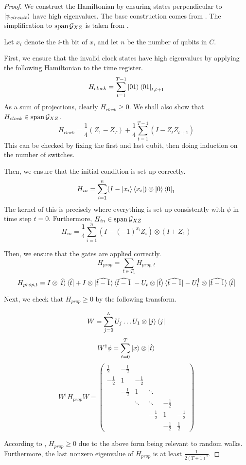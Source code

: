 \begin{proof}
	We construct the Hamiltonian by ensuring states perpendicular to $\ket{\psi_{circuit}}$ have high eigenvalues. The base construction comes from \cite{kitaev2002classical}. The simplification to $\operatorname*{\operatorname{span}}\mathcal{G}_{XZ}$ is taken from \cite{PhysRevA.78.012352}.

	Let $x_i$ denote the $i$-th bit of $x$, and let $n$ be the number of qubits in $C$.

	First, we ensure that the invalid clock states have high eigenvalues by applying the following Hamiltonian to the time register.
	$$H_{clock}=\sum_{t=1}^{T-1}\ket{01}\bra{01}_{t,t+1}$$
	As a sum of projections, clearly $H_{clock}\geq 0$. We shall also show that $H_{clock}\in\operatorname*{\operatorname{span}}\mathcal{G}_{XZ}$.
	$$H_{clock}=\frac{1}{4}(Z_1 - Z_T) + \frac{1}{4}\sum_{t=1}^{T-1}(I-Z_tZ_{t+1}) $$
	This can be checked by fixing the first and last qubit, then doing induction on the number of switches.

	Then, we ensure that the initial condition is set up correctly.
	$$H_{in}=\sum_{i=1}^n(I-\ket{x_i}\bra{x_i})\otimes\ket{0}\bra{0}_1$$
	The kernel of this is precisely where everything is set up consistently with $\phi$ in time step $t=0$. Furthermore, $H_{in}\in\operatorname*{\operatorname{span}}\mathcal{G}_{XZ}$
	$$H_{in}=\frac{1}{4}\sum_{i=1}^n(I-(-1)^{x_i}Z_i)\otimes(I+Z_1)$$

	Then, we ensure that the gates are applied correctly.
	$$H_{prop}=\sum_{t\in T_1}H_{prop,t}$$
	$$H_{prop,t}=I\otimes\ket{\widehat{t}}\bra{\widehat{t}}
	+I\otimes\ket{\widehat{t-1}}\bra{\widehat{t-1}}
	-U_t\otimes\ket{\widehat{t}}\bra{\widehat{t-1}}
	-U_t^\dagger\otimes\ket{\widehat{t-1}}\bra{\widehat{t}}$$

	Next, we check that $H_{prop}\geq0$ by the following transform.

	$$W=\sum_{j=0}^L U_j\ldots U_1\otimes\ket{j}\bra{j}$$
	$$W^\dagger\phi=\sum_{t=0}^T\ket{x}\otimes\ket{\hat{t}}$$
	$$W^\dagger H_{prop} W=
	\begin{pmatrix}
		\frac{1}{2} & -\frac{1}{2} & & & &  \\
		-\frac{1}{2} & 1 & -\frac{1}{2} & & & \\
		& -\frac{1}{2} & 1 & \ddots & & \\
		& & \ddots & \ddots & -\frac{1}{2} & \\
		& & & -\frac{1}{2} & 1 & -\frac{1}{2} \\
		& & & & -\frac{1}{2} & \frac{1}{2}
	\end{pmatrix}$$

	According to \cite{2002quant.ph.10077A}, $H_{prop}\geq 0$ due to the above form being relevant to random walks. Furthermore, the last nonzero eigenvalue of $H_{prop}$ is at least $\frac{1}{2(T+1)^2}$.


\end{proof}
